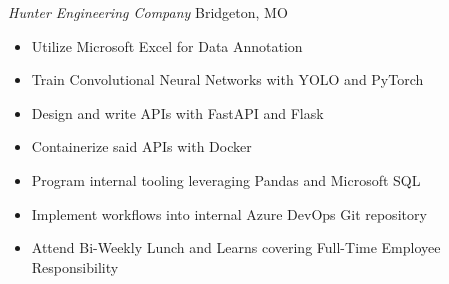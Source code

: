\documentclass[12pt]{article}
\begin{document}
\textsl{Hunter Engineering Company} \hfill Bridgeton, MO
\begin{itemize}[noitemsep]
    \item Utilize Microsoft Excel for Data Annotation
    \item Train Convolutional Neural Networks with YOLO and PyTorch
    \item Design and write APIs with FastAPI and Flask
    \item Containerize said APIs with Docker
    \item Program internal tooling leveraging Pandas and Microsoft SQL
    \item Implement workflows into internal Azure DevOps Git repository
    \item Attend Bi-Weekly Lunch and Learns covering Full-Time Employee Responsibility
\end{itemize}

\end{document}
